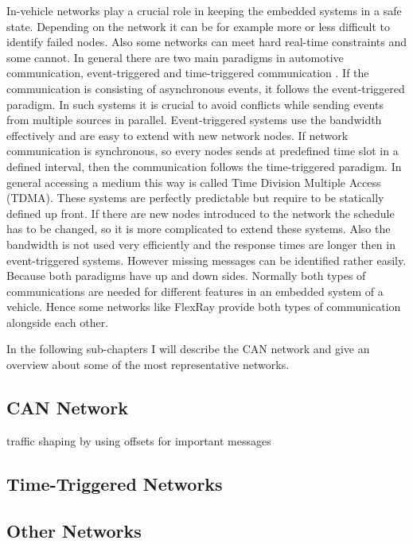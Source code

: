 In-vehicle networks play a crucial role in keeping the embedded systems in a
safe state. Depending on the network it can be for example more or less
difficult to identify failed nodes. Also some networks can meet hard real-time
constraints and some cannot. In general there are two main paradigms in
automotive communication, event-triggered and time-triggered communication
\cite{Navet2017}. If the communication is consisting of asynchronous events, it
follows the event-triggered paradigm. In such systems it is crucial to avoid
conflicts while sending events from multiple sources in parallel.
Event-triggered systems use the bandwidth effectively and are easy to extend
with new network nodes. If network communication is synchronous, so every nodes
sends at predefined time slot in a defined interval, then the communication
follows the time-triggered paradigm. In general accessing a medium this way is
called Time Division Multiple Access (TDMA). These systems are perfectly
predictable but require to be statically defined up front. If there are new
nodes introduced to the network the schedule has to be changed, so it is more
complicated to extend these systems. Also the bandwidth is not used very
efficiently and the response times are longer then in event-triggered systems.
However missing messages can be identified rather easily. Because both paradigms
have up and down sides. Normally both types of communications are needed for
different features in an embedded system of a vehicle. Hence some networks like
FlexRay provide both types of communication alongside each other.

In the following sub-chapters I will describe the CAN network and give an
overview about some of the most representative networks.

\subsection{CAN Network}


traffic shaping by using offsets for important messages~\cite{Navet2009}

\subsection{Time-Triggered Networks}

\subsection{Other Networks}

